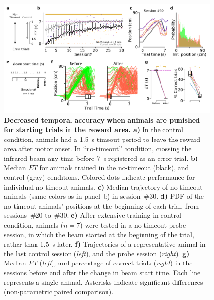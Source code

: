  \begin{figure}[bt!]
  \begin{center}
    \includegraphics[width=\textwidth]{ch-time/figures/NToTrd.pdf}
    \caption[No-Timeout Condition]
    {\textbf{Decreased temporal accuracy when animals are punished for starting trials in the reward area.}
    \textbf{a)}
    In the control condition, animals had a 1.5~s timeout period to leave the reward area after motor onset.
    In ``no-timeout'' condition, crossing the infrared beam any time before 7~s registered as an error trial.
    \textbf{b)}
    Median $ET$ for animals trained in the no-timeout (black), and control (gray) conditions.
    Colored dots indicate performance for individual no-timeout animals.
    \textbf{c)}
    Median trajectory of no-timeout animals (same colors as in panel~b) in session~\#30.
    \textbf{d)}
    PDF of the no-timeout animals' positions at the beginning of each trial, from sessions~\#20 to~\#30.
    \textbf{e)}
    After extensive training in control condition, animals ($n=7$) were tested in a no-timeout probe session, in which the beam started at the beginning of the trial, rather than 1.5~s later.
    \textbf{f)}
    Trajectories of a representative animal in the last control session (\textit{left}), and the probe session (\textit{right}).
    \textbf{g)}
    Median $ET$ (\textit{left}), and percentage of correct trials (\textit{right}) in the sessions before and after the change in beam start time.
    Each line represents a single animal.
    Asterisks indicate significant differences (non-parametric paired comparison).
    }
    \label{fig:time:ntoTrd}
  \end{center}
\end{figure}